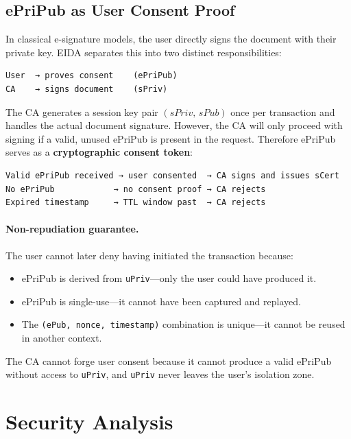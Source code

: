 \documentclass[11pt,a4paper]{article}
\begin{document}
\subsection{ePriPub as User Consent Proof}

In classical e-signature models, the user directly signs the document with
their private key.  EIDA separates this into two distinct responsibilities:

\begin{lstlisting}[style=protocol]
User  → proves consent    (ePriPub)
CA    → signs document    (sPriv)
\end{lstlisting}

The CA generates a session key pair $(\mathit{sPriv},\,\mathit{sPub})$ once
per transaction and handles the actual document signature.  However, the CA
will only proceed with signing if a valid, unused ePriPub is present in the
request.  Therefore ePriPub serves as a \textbf{cryptographic consent token}:

\begin{lstlisting}[style=protocol]
Valid ePriPub received → user consented  → CA signs and issues sCert
No ePriPub            → no consent proof → CA rejects
Expired timestamp     → TTL window past  → CA rejects
\end{lstlisting}

\paragraph{Non-repudiation guarantee.}
The user cannot later deny having initiated the transaction because:
\begin{itemize}
  \item ePriPub is derived from \texttt{uPriv}---only the user could have
        produced it.
  \item ePriPub is single-use---it cannot have been captured and replayed.
  \item The \texttt{(ePub, nonce, timestamp)} combination is unique---it
        cannot be reused in another context.
\end{itemize}
The CA cannot forge user consent because it cannot produce a valid ePriPub
without access to \texttt{uPriv}, and \texttt{uPriv} never leaves the user's
isolation zone.

\section{Security Analysis}
\end{document}
